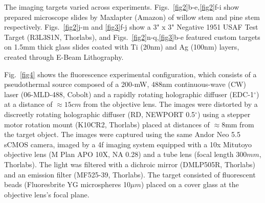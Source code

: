 \documentclass[pdflatex,sn-mathphys-num]{sn-jnl}%
\theoremstyle{thmstyleone}%
\theoremstyle{thmstyletwo}%
\theoremstyle{thmstylethree}%
\begin{document}
The imaging targets varied across experiments. Figs.~\ref{fig2}b-e,\ref{fig2}f-i show prepared microscope slides by Maxlapter (Amazon) of willow stem and pine stem respectively. Figs.~\ref{fig2}j-m and \ref{fig3}f-j show a 3" x 3" Negative 1951 USAF Test Target (R3L3S1N, Thorlabs), and Figs.~\ref{fig2}n-q,\ref{fig3}b-e featured custom targets on 1.5mm thick glass slides coated with Ti (20nm) and Ag (100nm) layers, created through E-Beam Lithography.

Fig.~\ref{fig4} shows the fluorescence experimental configuration, which consists of a pseudothermal source composed of a 200-mW, 488nm continuous-wave (CW) laser (06-MLD-488, Cobolt) and a rapidly rotating holographic diffuser (EDC-1$^\circ$) at a distance of $\approx 15cm$ from the objective lens. The images were distorted by a discreetly rotating holographic diffuser (RD, NEWPORT 0.5$^\circ$) using a stepper motor rotation mount (K10CR2, Thorlabs) placed at distances of $\approx 8$mm from the target object. The images were captured using the same Andor Neo 5.5 sCMOS camera, imaged by a 4f imaging system equipped with a 10x Mitutoyo objective lens (M Plan APO 10X, NA 0.28) and a tube lens (focal length $300mm$, Thorlabs). The light was filtered with a dichroic mirror (DMLP505R, Thorlabs) and an emission filter (MF525-39, Thorlabs). The target consisted of fluorescent beads (Fluoresbrite YG microspheres 10$\mu m$) placed on a cover glass at the objective lens's focal plane.
\end{document}
